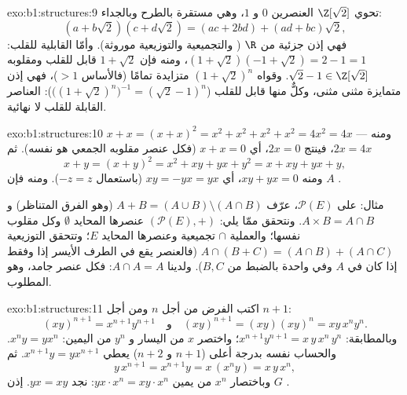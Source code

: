 \begin{solution}{exo:b1:structures:9}
تحوي $\Z[\sqrt 2]$ العنصرين $0$ و $1$، وهي مستقرة بالطرح
وبالجداء:
\[
(a + b\sqrt 2)(c + d\sqrt 2) = (ac + 2bd) + (ad + bc)\sqrt 2 ,
\]
فهي إذن  جزئية من $\R$ ( والتجميعية
والتوزيعية موروثة). وأمّا القابلية للقلب: $(1 + \sqrt 2)(-1 + \sqrt 2) =
2 - 1 = 1$، ومنه فإن $1 + \sqrt 2$ قابل للقلب ومقلوبه $\sqrt 2 - 1
\in \Z[\sqrt 2]$. وقواه $(1 + \sqrt 2)^n$ متزايدة
تمامًا (فالأساس $> 1$)، فهي إذن متمايزة مثنى مثنى، وكلٌّ منها
قابل للقلب ($\bigl((1+\sqrt2)^n\bigr)^{-1} = (\sqrt 2 - 1)^n$): 
العناصر القابلة للقلب لا نهائية.
\end{solution}

\begin{solution}{exo:b1:structures:10}
$x + x = (x + x)^2 = x^2 + x^2 + x^2 + x^2 = 4x^2 = 4x$ --- ومنه $2x =
4x$، فينتج $2x = 0$، أي $x + x = 0$ (فكل عنصر مقلوبه الجمعي
هو نفسه). ثم
\[
x + y = (x+y)^2 = x^2 + xy + yx + y^2 = x + xy + yx + y ,
\]
ومنه $xy + yx = 0$، أي $xy = -yx = yx$ (باستعمال $-z = z$). ومنه فإن $A$
.

مثال: على $\mathcal{P}(E)$، عرّف $A + B = (A \cup B) \setminus (A
\cap B)$ (وهو الفرق المتناظر) و$A \times B = A \cap B$. ونتحقق
ممّا يلي: $(\mathcal{P}(E), +)$  عنصرها المحايد
$\emptyset$ وكل  مقلوب نفسها؛ والعملية $\cap$ تجميعية
 وعنصرها المحايد $E$؛ وتتحقق التوزيعية $A \cap (B + C) = (A
\cap B) + (A \cap C)$ (فالعنصر يقع في الطرف الأيسر إذا وفقط إذا كان
في $A$ وفي واحدة بالضبط من $B, C$). ولدينا $A \cap A = A$: فكل
عنصر جامد، وهو المطلوب.
\end{solution}

\begin{solution}{exo:b1:structures:11}
اكتب الفرض من أجل $n$ ومن أجل $n+1$:
\[
(xy)^{n+1} = x^{n+1} y^{n+1}
\quad\text{و}\quad
(xy)^{n+1} = (xy)(xy)^n = xy\,x^n y^n .
\]
وبالمطابقة: $x^{n+1} y^{n+1} = x\,y\,x^n\,y^n$؛ واختصر $x$ من اليسار
و $y^n$ من اليمين: $x^n y = y x^n$. والحساب نفسه بدرجة
أعلى ($n+1$ و $n+2$) يعطي $x^{n+1} y = y x^{n+1}$. ثم
\[
y\,x^{n+1} = x^{n+1} y = x\,(x^n y) = x\,y\,x^n ,
\]
وباختصار $x^n$ من يمين $y x \cdot x^n = x y \cdot x^n$:
نجد $yx = xy$. إذن $G$ .
\end{solution}


